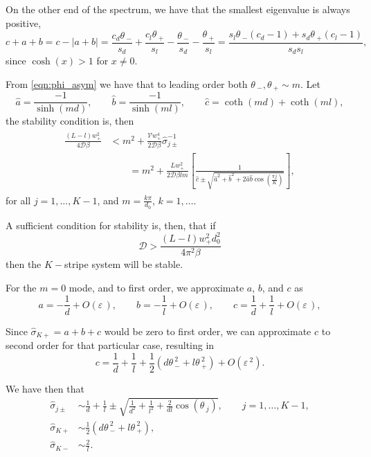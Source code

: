\documentclass[a4paper,10pt]{article}
\newcommand{\tH}{\ensuremath{\theta\,}}
\newcommand{\Ep}{\ensuremath{\varepsilon\,}}
\newcommand{\DD}{\ensuremath{\mathcal{D}}}
\newcommand{\VV}{\ensuremath{\mathcal{V}}}
\begin{document}
On the other end of the spectrum, we have that the smallest eigenvalue is always positive,
% 
\[
  c+a+b = c-|a+b| = \frac{c_d\tH_-}{s_d}+\frac{c_l\tH_+}{s_l}-\frac{\tH_-}{s_d}-\frac{\tH_+}{s_l} = \frac{s_l\tH_-(c_d-1) + s_d\tH_+(c_l-1)}{s_ds_l},
\]
% 
since $\cosh(x)>1$ for $x\neq0$.

From \eqref{eqn:phi_asym} we have that to leading order both $\tH_-,\tH_+\sim m$. Let
% 
\[
 \hat{a} = \frac{-1}{\sinh(md)}, \qquad \hat{b} = \frac{-1}{\sinh(ml)},\qquad \hat{c} = \coth(md)+\coth(ml),
\]
% 
the stability condition is, then
% 
\begin{equation}
\label{eqn:stab_cond}
\begin{split}
\begin{aligned}
  \frac{(L-l)w_+^2}{4\DD\beta} &< m^2 + \frac{\VV w_+^4}{2\DD\beta}\hat\sigma_{j\pm}^{-1}\\
  &\qquad = m^2 + \frac{L w_+^2}{2\DD\beta lm}\left[\frac{1}{\hat{c}\pm \sqrt{\hat{a}^2+\hat{b}^2+2\hat{a}\hat{b}\cos\left(\frac{\pi j}{K}\right)}}\right],
\end{aligned}
\end{split}
\end{equation}
% 
for all $j=1,\hdots,K-1$, and $m=\frac{k\pi}{d_0}$, $k=1,\hdots$.

A sufficient condition for stability is, then, that if
%
\begin{equation}
 \DD > \frac{(L-l)w_+^2d_0^2}{4\pi^2\beta}
\end{equation}
% 
then the $K-$stripe system will be stable.

For the $m=0$ mode, and to first order, we approximate $a$, $b$, and $c$ as
% 
\[
  a=-\frac{1}{d}+O(\Ep),\qquad b = -\frac{1}{l}+O(\Ep),\qquad c=\frac{1}{d}+\frac{1}{l}+O(\Ep),
\]
% 

Since $\hat\sigma_{K+}= a+b+c$ would be zero to first order, we can approximate $c$ to second order for that particular case, resulting in 
% 
\[
  c=\frac{1}{d}+\frac{1}{l}+\frac{1}{2}(d\tH_-^2+l\tH_+^2)+O(\Ep^2).
\]


We have then that
%
\begin{subequations}
\begin{align}
 \label{eqn:sigmas}
  \hat\sigma_{j\pm} &\sim \frac{1}{d}+\frac{1}{l}\pm\sqrt{\frac{1}{d^2}+\frac{1}{l^2}+\frac{2}{dl}\cos(\tH_j)},\qquad j=1,\hdots,K-1,\\
  \hat\sigma_{K+} &\sim \frac{1}{2}(d\tH_-^2+l\tH_+^2),\\
  \hat\sigma_{K-} &\sim \frac{2}{l}.
\end{align}
\end{subequations}
% 
\end{document}
